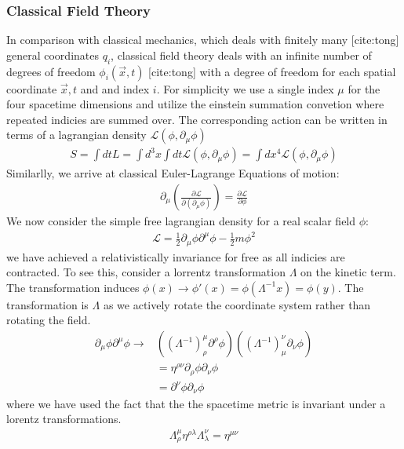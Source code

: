 \subsubsection{Classical Field Theory}
In comparison with classical mechanics, which deals with finitely many [cite:tong] general
 coordinates $q_i$, classical field theory deals with an infinite number of degrees of freedom 
$\phi_i(\vec x, t)$ [cite:tong] with a degree of freedom for each spatial coordinate  $\vec x,t$ and 
and index $i$. For simplicity we use a single index $\mu$ for the four spacetime dimensions and utilize
the einstein summation convetion where repeated indicies are summed over. 
The corresponding action can be written in terms of a lagrangian density $\mathcal{L}(\phi,\partial_\mu \phi)$
\begin{align*}
S = \int dt L = \int d^3x \int dt \mathcal{L}(\phi,\partial_\mu \phi) = \int dx^4 \mathcal{L}(\phi,\partial_\mu \phi)
\end{align*}
Similarlly, we arrive at classical Euler-Lagrange Equations of motion:
\begin{align*}
\partial_\mu \left( \frac{\partial\mathcal{L}}{\partial (\partial_\mu \phi)}\right) = \frac{\partial \mathcal{L}}{\partial\phi}
\end{align*}
We now consider the simple free lagrangian density for a real scalar field $\phi$:
\begin{align*}
\mathcal{L} = \frac{1}{2}\partial_\mu \phi \partial^\mu \phi - \frac{1}{2} m\phi^2 
\end{align*}
we have achieved a relativistically invariance for free as all indicies are contracted. To see this, consider a lorrentz transformation $\Lambda$ on the kinetic term. The transformation induces $\phi(x) \rightarrow \phi'(x) = \phi(\Lambda^{-1} x) = \phi (y)$. The transformation is $\Lambda$ as we actively
rotate the coordinate system rather than rotating the field. 
\begin{align*} 
\partial_\mu \phi \partial^\mu \phi \rightarrow& ((\Lambda^{-1})^\mu_\rho \partial^\rho \phi)( (\Lambda^{-1})_\mu^\nu \partial_\nu \phi) \\
&= \eta^{\rho\nu} \partial_\rho \phi \partial_\nu \phi \\
&= \partial^\nu \phi \partial_\nu \phi 
\end{align*}
where we have used the fact that the the spacetime metric is invariant under a lorentz transformations.
\begin{align*}
\Lambda^\mu_\rho \eta^{\rho \lambda} \Lambda_{\lambda}^\nu = \eta^{\mu\nu}
\end{align*}
